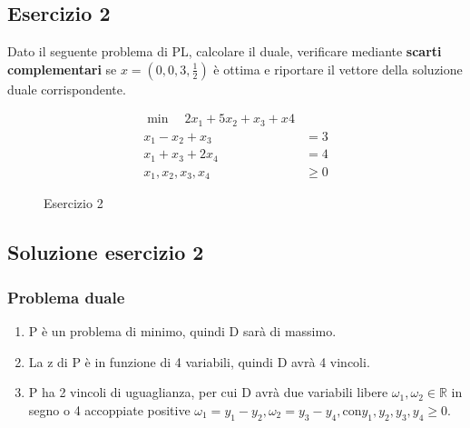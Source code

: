 \documentclass[\main/main.tex]{subfiles}
\begin{document}
\subsection{Esercizio 2}
Dato il seguente problema di PL, calcolare il duale, verificare mediante \textbf{scarti complementari} se $x=(0,0,3,\frac{1}{2})$ è ottima e riportare il vettore della soluzione duale corrispondente.

\begin{figure}
  \begin{align*}
    \min \quad 2x_1 + 5x_2 + x_3 + x4 \\
    x_1 - x_2 + x_3  & = 3            \\
    x_1 + x_3 + 2x_4 & = 4            \\
    x_1,x_2,x_3,x_4  & \geq 0
  \end{align*}
  \caption{Esercizio 2}
\end{figure}

\subsection{Soluzione esercizio 2}
\subsubsection*{Problema duale}
\begin{enumerate}
  \item P è un problema di minimo, quindi D sarà di massimo.
  \item La z di P è in funzione di 4 variabili, quindi D avrà 4 vincoli.
  \item P ha 2 vincoli di uguaglianza, per cui D avrà due variabili libere $\omega_1, \omega_2 \in \mathbb{R}$ in segno o 4 accoppiate positive $\omega_1 = y_1 - y_2, \omega_2 = y_3 - y_4, \text{con} y_1, y_2, y_3, y_4 \geq 0$.
\end{enumerate}
\end{document}
